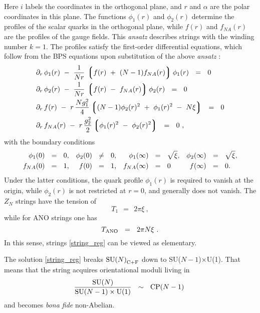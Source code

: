 \documentclass[12pt]{article}
\def\beq{\begin{equation}}
\def\eeq{\end{equation}}
\newcommand{\p}{\partial}
\newcommand{\lgr}{\left\lgroup}
\newcommand{\rgr}{\right\rgroup}
\def\cfl {$\text{SU($N$)}_{\rm C+F}$ }
\begin{document}
	Here $ i $ labels the coordinates in the orthogonal plane, and $ r $ and $ \alpha $
	are the polar coordinates in this plane.
	The functions $ \phi_1(r) $ and $ \phi_2(r) $ determine the profiles of the scalar quarks
	in the orthogonal plane, while $ f(r) $ and $ f_{NA}(r) $ are the profiles of the gauge
	fields. 
	This {\it ansatz} describes strings with the winding number $ k = 1 $.
	The profiles satisfy the first-order differential equations, which follow from the BPS
	equations upon substitution of the above {\it ansatz} \cite{MY,ABEKY}:
\begin{align}
%
\notag
&	\p_r\, \phi_1(r) ~-~ \frac{1}{Nr}\, \lgr f(r) ~+~ (N-1)f_{NA}(r) \rgr \phi_1(r) ~~=~~ 0 \\
%
\notag
&	\p_r\, \phi_2(r) ~-~ \frac{1}{Nr}\, \lgr f(r) ~-~ f_{NA}(r) \rgr \phi_2(r) ~~=~~ 0 \\
%
\label{foes}
&	\p_r\, f(r) ~-~ r\, \frac{N g_1^2}{4} \lgr (N-1)\phi_2(r)^2 ~+~ \phi_1(r)^2 ~-~ N\xi \rgr ~~=~~ 0 \\
%
\notag
&	\p_r\, f_{NA}(r)  ~-~  r\, \frac{g_2^2}{2} \lgr \phi_1(r)^2 ~-~ \phi_2(r)^2 \rgr ~~=~~ 0~,
\end{align}
	with the boundary conditions
\begin{align}
%
\label{boundary}
	\phi_1(0) & ~~=~~  0\text,                   & \phi_2(0) & ~~\neq~~ 0\text,  &
	\phi_1(\infty) & ~~=~~ \sqrt{\xi} \text,     & \phi_2(\infty) & ~~=~~ \sqrt{\xi}\text, \\
%
\notag
	f_{NA}(0) & ~~=~~ 1\text,                   & f(0) & ~~=~~ 1\text,   &
	f_{NA}(\infty) & ~~=~~ 0 \text\,            &  f(\infty) & ~~=~~ 0\text.
\end{align}
	Under the latter conditions, the quark profile $ \phi_1(r) $ is required to vanish at the origin, while 
	$ \phi_2(r) $ is not restricted at $ r = 0 $, and generally does not vanish.
	The $ Z_N $ strings have the tension of
\[
	T_1  ~~=~~ 2\pi\xi~,
\]
	while for ANO strings one has
\[
	T_{\rm ANO} ~~=~~ 2\pi N \xi~.
\]
	In this sense, strings \eqref{string_reg} can be viewed as elementary.

	The solution \eqref{string_reg} breaks \cfl down to SU($N-1$)$\times$U(1). 
	That means that the string acquires orientational moduli living in 
\beq
\label{modulispace}
	\frac{\text{SU($N$)}}
            {\text{SU($N-1$)} \times {\rm U(1)}}         ~~\sim~~  \text{CP($N-1$)}~
\eeq
	and becomes {\it bona fide} non-Abelian.
\end{document}
